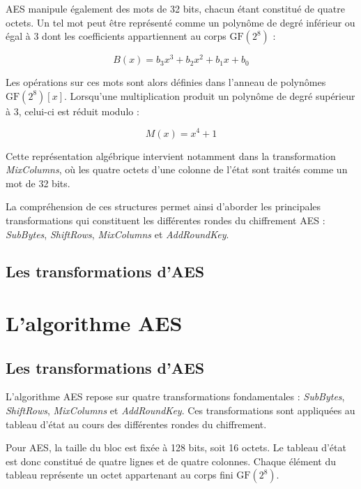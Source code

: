 \documentclass[12pt,a4paper]{article}
\begin{document}
AES manipule également des mots de 32 bits, chacun étant constitué de
quatre octets. Un tel mot peut être représenté comme un polynôme de
degré inférieur ou égal à 3 dont les coefficients appartiennent au
corps $\mathrm{GF}(2^8)$ :

\begin{equation}
B(x)=b_3x^3+b_2x^2+b_1x+b_0
\end{equation}

Les opérations sur ces mots sont alors définies dans l'anneau de
polynômes $\mathrm{GF}(2^8)[x]$. Lorsqu'une multiplication produit un
polynôme de degré supérieur à 3, celui-ci est réduit modulo :

\begin{equation}
M(x)=x^4+1
\end{equation}

Cette représentation algébrique intervient notamment dans la
transformation \textit{MixColumns}, où les quatre octets d'une colonne
de l'état sont traités comme un mot de 32 bits.

La compréhension de ces structures permet ainsi d'aborder les
principales transformations qui constituent les différentes rondes
du chiffrement AES : \textit{SubBytes}, \textit{ShiftRows},
\textit{MixColumns} et \textit{AddRoundKey}.

\subsection{Les transformations d'AES}

\section{L'algorithme AES}

\subsection{Les transformations d'AES}

L'algorithme AES repose sur quatre transformations fondamentales :
\textit{SubBytes}, \textit{ShiftRows}, \textit{MixColumns} et
\textit{AddRoundKey}. Ces transformations sont appliquées au tableau
d'état au cours des différentes rondes du chiffrement.

Pour AES, la taille du bloc est fixée à 128 bits, soit 16 octets.
Le tableau d'état est donc constitué de quatre lignes et de quatre
colonnes. Chaque élément du tableau représente un octet appartenant
au corps fini $\mathrm{GF}(2^8)$.
\end{document}
